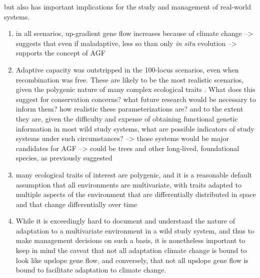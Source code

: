 \documentclass[9pt,twocolumn,twoside,lineno]{pnas-new}
\begin{document}
but also has important
implications for the study and management of real-world systems.
   \begin{enumerate}
        \item in all scenarios, up-gradient gene flow increases because of climate change --> suggests that even if maladaptive, less so than only \textit{in situ} evolution --> supports the concept of AGF
        \item Adaptive capacity was outstripped in the 100-locus scenarios, even when recombination was free. These are likely to be the most realistic scenarios, given the polygenic nature of many complex ecological traits \cite{barghi_polygenic}. What does this suggest for conservation concerns? what future research would be necessary to inform them? how realistic these parameterizations are? and to the extent they are, given the difficulty and expense of obtaining functional genetic information in most wild study systems, what are possible indicators of study systems under such circumstances? --> those systems would be major candidates for AGF --> could be trees and other long-lived, foundational species, as previously suggested \cite{aitken_whitlock, aitken_bemmels}
        \item many ecological traits of interest are polygenic, and it is a reasonable default assumption that all environments are multivariate, with traits adapted to multiple aspects of the environment that are differentially distributed in space and that change differentially over time
        \item While it is exceedingly hard to document and understand the nature of adaptation to a multivariate environment in a wild study system, and thus to make management decisions on such a basis, it is nonetheless important to keep in mind the caveat that not all adaptation climate change is bound to look like upslope gene flow, and conversely, that not all upslope gene flow is bound to facilitate adaptation to climate change.
    \end{enumerate}
\end{document}
